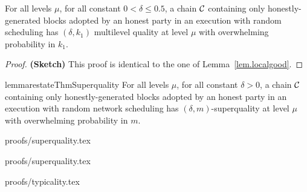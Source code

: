 \begin{lemma}\label{lem.multilevel}
For all levels $\mu$, for all constant $0 < \delta \leq 0.5$, a chain $\mathcal{C}$
containing only honestly-generated blocks adopted by an honest party in an
execution with random scheduling has $(\delta, k_1)$ multilevel quality at level
$\mu$ with overwhelming probability in $k_1$.
\end{lemma}
\begin{proof}\textbf{(Sketch)}
This proof is identical to the one of Lemma~\ref{lem.localgood}.
\Qed
\end{proof}

\begin{restatable}[Superquality]{lemma}{restateThmSuperquality}
\label{lem.superquality}
For all levels $\mu$, for all constant $\delta > 0$, a chain
$\mathcal{C}$ containing only honestly-generated blocks adopted by an honest party in
an execution with random network scheduling has $(\delta, m)$-superquality at level
$\mu$ with overwhelming probability in $m$.
\end{restatable}
{proofs/superquality.tex}

{proofs/superquality.tex}


\restateThmTypicality
{proofs/typicality.tex}








